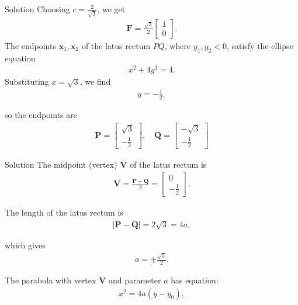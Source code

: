 \documentclass{beamer}
\begin{document}
\begin{frame}{Solution}
Choosing $c = \frac{2}{\sqrt{3}}$, we get
\begin{align}
\mathbf{F} = \frac{\sqrt{3}}{2} \begin{bmatrix} 1 \\ 0 \end{bmatrix}.
\end{align}
The endpoints $\mathbf{x}_1, \mathbf{x}_2$ of the latus rectum $PQ$, where $y_1, y_2 < 0$, satisfy the ellipse equation
\begin{align}
x^2 + 4 y^2 = 4.
\end{align}
Substituting $x = \sqrt{3}$, we find
\begin{align}
y = -\frac{1}{2},
\end{align}

so the endpoints are
\begin{align}
\mathbf{P} = \begin{bmatrix} \sqrt{3} \\ -\frac{1}{2} \end{bmatrix}, \quad
\mathbf{Q} = \begin{bmatrix} -\sqrt{3} \\ -\frac{1}{2} \end{bmatrix}
\end{align}
\end{frame}

\begin{frame}{Solution}
The midpoint (vertex) $\mathbf{V}$ of the latus rectum is
\begin{align}
\mathbf{V} = \frac{\mathbf{P} + \mathbf{Q}}{2} = \begin{bmatrix} 0 \\ -\frac{1}{2} \end{bmatrix}.
\end{align}

The length of the latus rectum is
\begin{align}
|\mathbf{P} - \mathbf{Q}| = 2 \sqrt{3} = 4a,
\end{align}

which gives
\begin{align}
a = \pm\frac{\sqrt{3}}{2}.
\end{align}


The parabola with vertex $\mathbf{V}$ and parameter $a$ has equation:
\begin{align}
x^2 = 4 a (y - y_0),
\end{align}
\end{frame}
\end{document}
